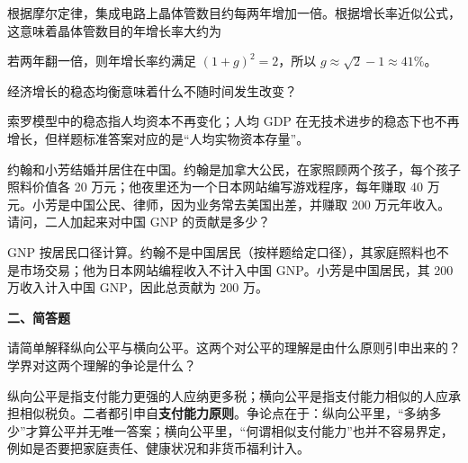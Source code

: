 \begin{question}
根据摩尔定律，集成电路上晶体管数目约每两年增加一倍。根据增长率近似公式，这意味着晶体管数目的年增长率大约为
\begin{choiceoptions}[2]
\end{choiceoptions}
\begin{solution}
若两年翻一倍，则年增长率约满足 $(1+g)^2=2$，所以 $g\approx \sqrt2-1\approx 41\%$。
\end{solution}
\end{question}

\begin{question}
经济增长的稳态均衡意味着什么不随时间发生改变？
\begin{choiceoptions}[2]
\end{choiceoptions}
\begin{solution}
索罗模型中的稳态指人均资本不再变化；人均 GDP 在无技术进步的稳态下也不再增长，但样题标准答案对应的是“人均实物资本存量”。
\end{solution}
\end{question}

\begin{question}
约翰和小芳结婚并居住在中国。约翰是加拿大公民，在家照顾两个孩子，每个孩子照料价值各 20 万元；他夜里还为一个日本网站编写游戏程序，每年赚取 40 万元。小芳是中国公民、律师，因为业务常去美国出差，并赚取 200 万元年收入。请问，二人加起来对中国 GNP 的贡献是多少？
\begin{choiceoptions}[2]
\end{choiceoptions}
\begin{solution}
GNP 按居民口径计算。约翰不是中国居民（按样题给定口径），其家庭照料也不是市场交易；他为日本网站编程收入不计入中国 GNP。小芳是中国居民，其 200 万收入计入中国 GNP，因此总贡献为 200 万。
\end{solution}
\end{question}

\textbf{二、简答题}

\begin{question}
请简单解释纵向公平与横向公平。这两个对公平的理解是由什么原则引申出来的？学界对这两个理解的争论是什么？
\begin{solution}
纵向公平是指支付能力更强的人应纳更多税；横向公平是指支付能力相似的人应承担相似税负。二者都引申自\textbf{支付能力原则}。争论点在于：纵向公平里，“多纳多少”才算公平并无唯一答案；横向公平里，“何谓相似支付能力”也并不容易界定，例如是否要把家庭责任、健康状况和非货币福利计入。\end{solution}
\end{question}

